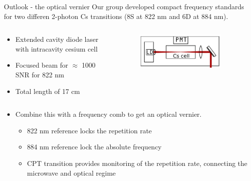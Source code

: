 \begin{block}{Outlook - the optical vernier}
  Our group developed compact frequency standards for two differen 2-photon Cs transitions (8S at 822 nm and 6D at 884 nm).
  \begin{columns}
    \begin{column}{0.60\textwidth}
     \begin{itemize}
     \item Extended cavity diode laser with intracavity cesium cell
     \item Focused beam for $\approx$ 1000 SNR for 822 nm
     \item Total length of 17 cm
     \end{itemize}
    \end{column}
    \begin{column}{0.39\textwidth}
      \begin{figure}
        \begin{center}
          \includegraphics[width=0.9\textwidth]{figures/compactreference}
        \end{center}
      \end{figure}
    \end{column}
  \end{columns}
  \begin{columns}
    \begin{column}{0.60\textwidth}
     \begin{itemize}
     \item   Combine this with a frequency comb to get an optical vernier.
       \begin{itemize}
       \item 822 nm reference locks the repetition rate
       \item 884 nm reference lock the absolute frequency
       \item CPT transition provides monitoring of the repetition rate, connecting the microwave and optical regime
       \end{itemize}
     \end{itemize}

\end{column}
\end{columns}
\end{block}
